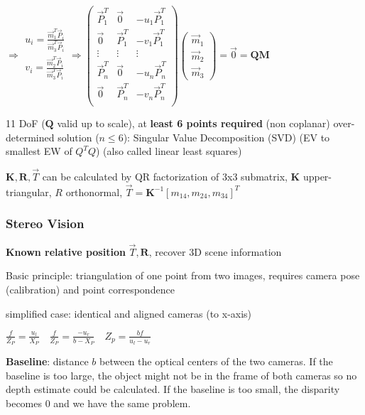 \documentclass[fontsize=6pt]{scrartcl}
\newcommand{\mat}[1]{\mathbf{#1}}
\begin{document}
\begin{multicols*}{4}
$
\Rightarrow
\begin{matrix}
u_i = \frac{\vec{m}_1^T\vec{P}_i}{\vec{m}_3^T\vec{P}_i}\\
v_i = \frac{\vec{m}_2^T\vec{P}_i}{\vec{m}_3^T\vec{P}_i}\\
\end{matrix}
\Rightarrow
\begin{pmatrix}
\vec P_1^T &  \vec 0 & -u_1 \vec{P}_1^T\\
\vec 0 &  \vec P_1^T & -v_1 \vec{P}_1^T\\
\vdots & \vdots & \vdots\\
\vec P_n^T &  \vec 0 & -u_n \vec{P}_n^T\\
\vec 0 &  \vec P_n^T & -v_n \vec{P}_n^T\\
\end{pmatrix}
\begin{pmatrix}
\vec{m}_1\\
\vec{m}_2\\
\vec{m}_3
\end{pmatrix}
=\vec{0}=\mat Q \mat M
$

11 DoF ($\mat Q$ valid up to scale), at \textbf{least 6 points required} (non coplanar)
over-determined solution ($n\leq6$): Singular Value Decomposition (SVD) (EV to smallest EW of $Q^T Q$) (also called linear least squares)

$\mat K, \mat R, \vec T$ can be calculated by QR factorization of 3x3 submatrix, $\mat K $ upper-triangular, $R$ orthonormal, $\vec T = \mat K^{-1}[m_{14}, m_{24}, m_{34}]^T$


\subsubsection*{Stereo Vision}
\textbf{Known relative position} $\vec T, \mat R$, recover 3D scene information

Basic principle: triangulation of one point from two images, requires camera pose (calibration) and point correspondence

\begin{minipage}{0.6\linewidth}

	simplified case: identical and aligned cameras (to x-axis)

	$ \frac{f}{Z_P} = \frac{u_l}{X_P} \quad \frac{f}{Z_P} = \frac{-u_r}{b-X_P} \quad Z_p = \frac{bf}{u_l - u_r}$

	\textbf{Baseline}: distance $b$ between the optical centers of the two cameras. If the baseline is too
			large, the object might not be in the frame of both cameras so no depth estimate could be
			calculated. If the baseline is too small, the disparity becomes $0$ and we have the same problem.


\end{minipage}
\end{multicols*}
\end{document}
